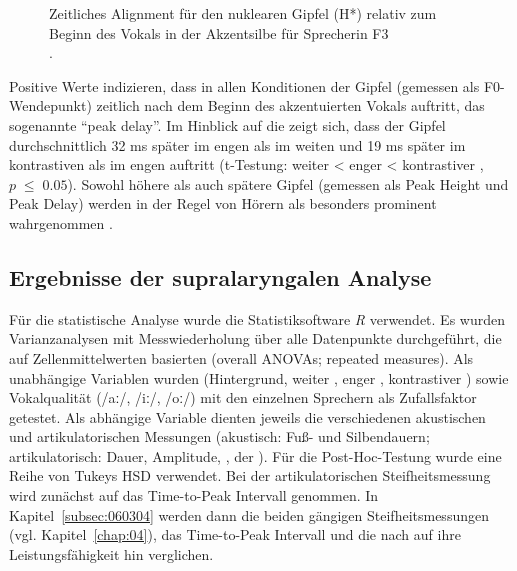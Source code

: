 \begin{figure} 
	\caption{Zeitliches Alignment für den nuklearen Gipfel (H*) relativ zum Beginn des Vokals in der Akzentsilbe für Sprecherin F3\\ \citep[adaptiert von][]{Krüger2009}.}
	\label{figure:0610b}
\end{figure}


Positive Werte indizieren, dass in allen Konditionen der Gipfel (gemessen als F0-Wendepunkt) zeitlich nach dem Beginn des akzentuierten Vokals auftritt, das sogenannte \enquote{peak delay}. Im Hinblick auf die  zeigt sich, dass der Gipfel durchschnittlich 32 ms später im engen als im weiten  und 19 ms später im kontrastiven als im engen  auftritt (t-Testung: weiter  < enger  < kontrastiver , $p\;\leq\;0.05$). Sowohl höhere als auch spätere Gipfel (gemessen als Peak Height und Peak Delay) werden in der Regel von Hörern als besonders prominent wahrgenommen \citep{Gussenhoven2004}.

\subsection{Ergebnisse der supralaryngalen Analyse}
\label{subsec:060303}

Für die statistische Analyse wurde die Statistiksoftware \textit{R} \citep{Rcite} verwendet. Es wurden Varianzanalysen mit Messwiederholung über alle Datenpunkte durchgeführt, die auf Zellenmittelwerten basierten (overall ANOVAs; repeated measures). Als unabhängige Variablen wurden  (Hintergrund, weiter , enger , kontrastiver ) sowie Vokalqualität (/aː/, /iː/, /oː/) mit den einzelnen Sprechern als Zufallsfaktor getestet. Als abhängige Variable dienten jeweils die verschiedenen akustischen und artikulatorischen Messungen (akustisch: Fuß- und Silbendauern; artikulatorisch: Dauer, Amplitude, ,  der ). Für die Post-Hoc-Testung wurde eine Reihe von Tukeys HSD verwendet. Bei der artikulatorischen Steifheitsmessung wird zunächst auf das Time-to-Peak Intervall genommen. In Kapitel~\ref{subsec:060304} werden dann die beiden gängigen Steifheitsmessungen (vgl. Kapitel~\ref{chap:04}), das Time-to-Peak Intervall und die  nach \citet{Munhall1985} auf ihre Leistungsfähigkeit hin verglichen.


